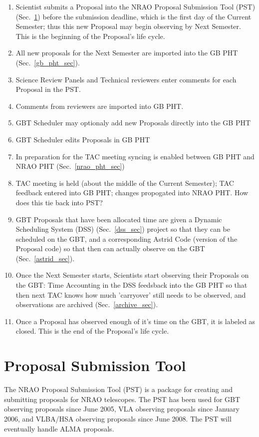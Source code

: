 \documentclass{article}
\begin{document}
\begin{enumerate}
\item Scientist submits a Proposal into the NRAO Proposal Submission Tool
(PST) (Sec.~\ref{pst_sec}) before the submission deadline, which is the first day of the Current
Semester; thus this new Proposal may begin observing by Next Semester.  This
is the beginning of the Proposal's life cycle.
\item All new proposals for the Next Semester are imported into the GB PHT (Sec.~\ref{gb_pht_sec}).
\item Science Review Panels and Technical reviewers enter comments for each
Proposal in the PST.
\item Comments from reviewers are imported into GB PHT.
\item GBT Scheduler may optionaly add new Proposals directly into the GB PHT
\item GBT Scheduler edits Proposals in GB PHT
\item In preparation for the TAC meeting syncing is enabled between GB PHT and NRAO PHT (Sec.~\ref{nrao_pht_sec})
\item TAC meeting is held (about the middle of the Current Semester); TAC
feedback entered into GB PHT; changes propogated into NRAO PHT.  How does this
tie back into PST?
\item GBT Proposals that have been allocated time are given a Dynamic
Scheduling System (DSS) (Sec.~\ref{dss_sec}) project so that they can be scheduled on the GBT, and
a corresponding Astrid Code (version of the Proposal code) so that then can
actually observe on the GBT (Sec.~\ref{astrid_sec}).
\item Once the Next Semester starts, Scientists start observing their
Proposals on the GBT:
Time Accounting in the DSS feedsback into the GB PHT so that then next TAC
knows how much 'carryover' still needs to be observed, and observations are
archived (Sec.~\ref{archive_sec}).
\item Once a Proposal has observed enough of it's time on the GBT, it is
labeled as closed.  This is the end of the Proposal's life cycle.
\end{enumerate}

\section{Proposal Submission Tool}\label{pst_sec}

The NRAO Proposal Submission Tool (PST) is a package for creating and submitting proposals for 
NRAO telescopes. The PST has been used for GBT observing proposals since June 2005, 
VLA observing proposals since January 2006, and VLBA/HSA observing proposals since June 2008. 
The PST will eventually handle ALMA proposals.
\end{document}
